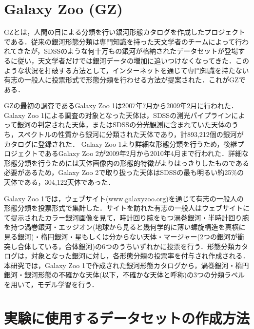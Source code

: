 \documentclass[a4j, 11pt]{jreport}
\begin{document}
\section{Galaxy Zoo (GZ)}
GZ\cite{Lintott2008}とは，人間の目による分類を行い銀河形態カタログを作成したプロジェクトである．従来の銀河形態分類は専門知識を持った天文学者のチームによって行われてきたが，SDSSのような何十万もの銀河が格納されたデータセットが登場するに従い，天文学者だけでは銀河データの増加に追いつけなくなってきた．このような状況を打破する方法として，インターネットを通じて専門知識を持たない有志の一般人に投票形式で形態分類を行わせる方法が提案された．これがGZである．

GZの最初の調査であるGalaxy Zoo 1\cite{Lintott2010}は2007年7月から2009年2月に行われた．Galaxy Zoo 1による調査の対象となった天体は，SDSSの測光パイプラインによって銀河の判定された天体，またはSDSSの分光観測に含まれていた天体のうち，スペクトルの性質から銀河に分類された天体であり，計893,212個の銀河がカタログに登録された．
Galaxy Zoo 1より詳細な形態分類を行うため，後継プロジェクトであるGalaxy Zoo 2\cite{Willett2013}が2009年2月から2010年4月まで行われた．詳細な形態分類を行うためには天体画像内の形態的特徴がよりはっきりしたものである必要があるため，Galaxy Zoo 2で取り扱った天体はSDSSの最も明るい約25\%の天体である，304,122天体であった．

Galaxy Zoo 1では，ウェブサイト(www.galaxyzoo.org)を通じて有志の一般人の形態分類を投票形式で集計した．サイトを訪れた有志の一般人はウェブサイトにて提示されたカラー銀河画像を見て，時計回り腕をもつ渦巻銀河・半時計回り腕を持つ渦巻銀河・エッジオン(地球から見ると幾何学的に薄い螺旋構造を真横に見る銀河)・楕円銀河・星もしくは分からない天体・マージャー(2つの銀河が衝突し合体している，合体銀河)の6つのうちいずれかに投票を行う．形態分類カタログは，対象となった銀河に対し，各形態分類の投票率を付与され作成される．本研究では，Galaxy Zoo 1で作成された銀河形態カタログから，渦巻銀河・楕円銀河・銀河形態の不確かな天体(以下，不確かな天体と呼称)の3つの分類ラベルを用いて，モデル学習を行う．




\section{実験に使用するデータセットの作成方法}
\end{document}
